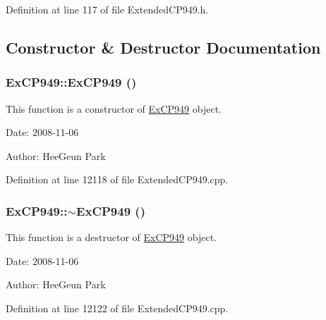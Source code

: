 Definition at line 117 of file ExtendedCP949.h.

\subsection{Constructor \& Destructor Documentation}
\hypertarget{classkmaOrange_1_1ExCP949_1ed1dd58587eef4c1561c1689efdfedd}{
\subsubsection[{ExCP949}]{\setlength{\rightskip}{0pt plus 5cm}ExCP949::ExCP949 ()}}
\label{classkmaOrange_1_1ExCP949_1ed1dd58587eef4c1561c1689efdfedd}


This function is a constructor of \hyperlink{classkmaOrange_1_1ExCP949}{ExCP949} object. 

\begin{Desc}
\item[Date:]2008-11-06 \end{Desc}
\begin{Desc}
\item[Author:]HeeGeun Park \end{Desc}


Definition at line 12118 of file ExtendedCP949.cpp.\hypertarget{classkmaOrange_1_1ExCP949_10256a72aecc859bd7572082ba5059fa}{
\subsubsection[{$\sim$ExCP949}]{\setlength{\rightskip}{0pt plus 5cm}ExCP949::$\sim$ExCP949 ()}}
\label{classkmaOrange_1_1ExCP949_10256a72aecc859bd7572082ba5059fa}


This function is a destructor of \hyperlink{classkmaOrange_1_1ExCP949}{ExCP949} object. 

\begin{Desc}
\item[Date:]2008-11-06 \end{Desc}
\begin{Desc}
\item[Author:]HeeGeun Park \end{Desc}


Definition at line 12122 of file ExtendedCP949.cpp.

